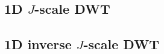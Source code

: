 \subsection{\texorpdfstring{1D \(J\)-scale DWT}{1D J-scale DWT}}


\subsection{\texorpdfstring{1D inverse \(J\)-scale DWT}{1D inverse J-scale DWT}}


\clearpage